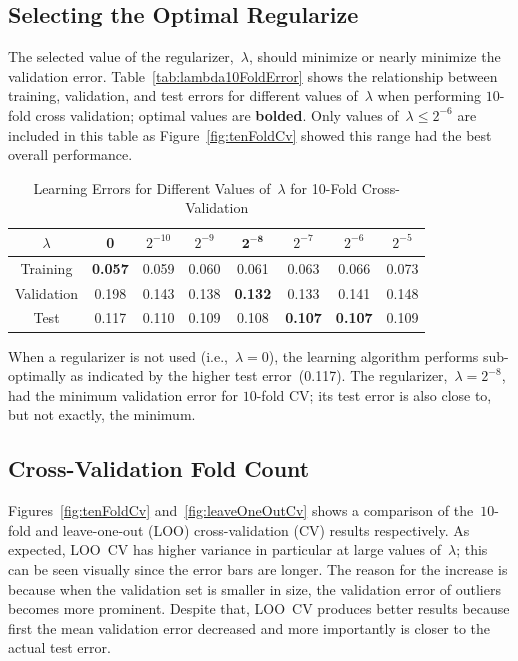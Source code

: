 \documentclass{report}
\begin{document}
  \subsection{Selecting the Optimal Regularize}\label{sec:selectOptimalRegularizer}
  
  The selected value of the regularizer,~$\lambda$, should minimize or nearly minimize the validation error.  Table~\ref{tab:lambda10FoldError} shows the relationship between training, validation, and test errors for different values of~$\lambda$ when performing $10$-fold cross validation; optimal values are \textbf{bolded}.   Only values of~$\lambda \leq 2^{-6}$ are included in this table as Figure~\ref{fig:tenFoldCv} showed this range had the best overall performance.
  
  \begin{table}[b]
    \centering
    \caption{Learning Errors for Different Values of~$\lambda$ for 10-Fold Cross-Validation}\label{tab:lambda10FoldError}
    \label{my-label}
    \begin{tabular}{c||c|c|c|c|c|c|c}
      \hline
      $\lambda$  & 0     & $2^{-10}$ & $2^{-9}$ & $\mathbf{2^{-8}}$ & $2^{-7}$ & $2^{-6}$ & $2^{-5}$ \\ \hline\hline
      Training   & \textbf{0.057} & 0.059     & 0.060    & 0.061    & 0.063    & 0.066    & 0.073    \\ \hline
      Validation & 0.198 & 0.143     & 0.138    & \textbf{0.132}    & 0.133    & 0.141    & 0.148    \\ \hline
      Test       & 0.117 & 0.110     & 0.109    & 0.108    & \textbf{0.107}    & \textbf{0.107}    & 0.109    \\ \hline
    \end{tabular}
  \end{table}
  
  When a regularizer is not used (i.e.,~$\lambda=0$), the learning algorithm performs sub-optimally as indicated by the higher test error~(0.117). The regularizer,~$\lambda=2^{-8}$, had the minimum validation error for $10$-fold CV; its test error is also close to, but not exactly, the minimum.
  
  \subsection{Cross-Validation Fold Count}\label{sec:cvFoldCount}
  
  Figures~\ref{fig:tenFoldCv} and~\ref{fig:leaveOneOutCv} shows a comparison of the~$10$-fold and leave-one-out (LOO) cross-validation (CV) results respectively.  As expected, LOO~CV has higher variance in particular at large values of~$\lambda$; this can be seen visually since the error bars are longer.  The reason for the increase is because when the validation set is smaller in size, the validation error of outliers becomes more prominent.  Despite that, LOO~CV produces better results because first the mean validation error decreased and more importantly is closer to the actual test error.
  
\end{document}
